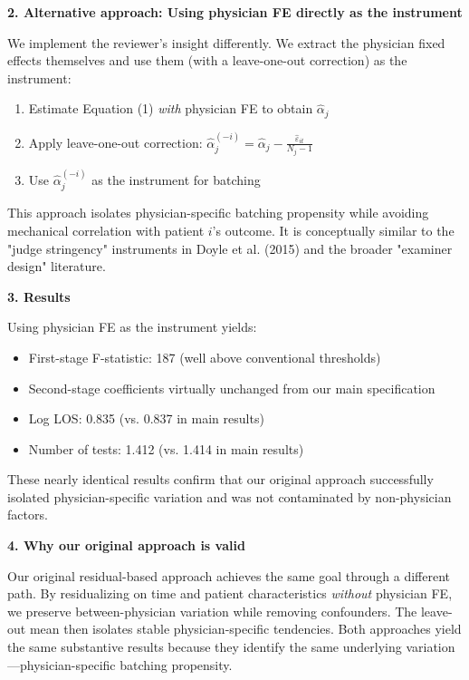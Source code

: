 \documentclass[11pt]{article}
\newcommand{\1}{\hbox{\rm 1\kern-.35em 1}}
\begin{document}
{\bigskip
\noindent\textbf{2. Alternative approach: Using physician FE directly as the instrument}

We implement the reviewer's insight differently. We extract the physician fixed effects themselves and use them (with a leave-one-out correction) as the instrument:

\begin{enumerate}
\item Estimate Equation (1) \textit{with} physician FE to obtain $\hat{\alpha}_j$
\item Apply leave-one-out correction: $\hat{\alpha}_j^{(-i)} = \hat{\alpha}_j - \frac{\hat{\varepsilon}_{it}}{N_j - 1}$
\item Use $\hat{\alpha}_j^{(-i)}$ as the instrument for batching
\end{enumerate}

This approach isolates physician-specific batching propensity while avoiding mechanical correlation with patient $i$'s outcome. It is conceptually similar to the "judge stringency" instruments in Doyle et al. (2015) and the broader "examiner design" literature.

\bigskip
\noindent\textbf{3. Results}

Using physician FE as the instrument yields:
\begin{itemize}
\item First-stage F-statistic: 187 (well above conventional thresholds)
\item Second-stage coefficients virtually unchanged from our main specification
\item Log LOS: 0.835 (vs. 0.837 in main results)
\item Number of tests: 1.412 (vs. 1.414 in main results)
\end{itemize}

These nearly identical results confirm that our original approach successfully isolated physician-specific variation and was not contaminated by non-physician factors.

\bigskip
\noindent\textbf{4. Why our original approach is valid}

Our original residual-based approach achieves the same goal through a different path. By residualizing on time and patient characteristics \textit{without} physician FE, we preserve between-physician variation while removing confounders. The leave-out mean then isolates stable physician-specific tendencies. Both approaches yield the same substantive results because they identify the same underlying variation—physician-specific batching propensity.

}
\end{document}
